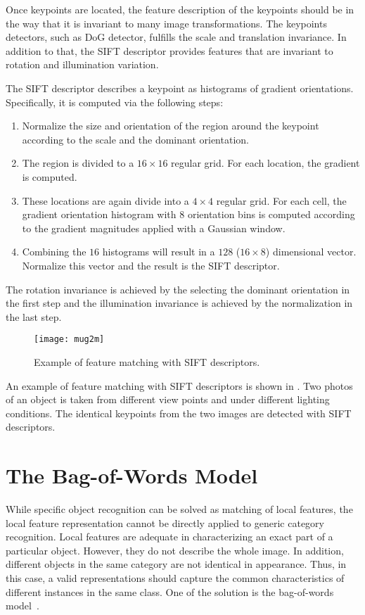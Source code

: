 \documentclass[12pt,final,twoside]{report}
\begin{document}
Once keypoints are located, the feature description of the keypoints should be in the way that it is invariant to many image transformations. The keypoints detectors, such as DoG detector, fulfills the scale and translation invariance. In addition to that, the SIFT descriptor provides features that are invariant to rotation and illumination variation.

The SIFT descriptor describes a keypoint as histograms of gradient orientations. Specifically, it is computed via the following steps:
\begin{enumerate}
  \item Normalize the size and orientation of the region around the keypoint according to the scale and the dominant orientation.
  \item The region is divided to a $16 \times 16$ regular grid. For each location, the gradient is computed.
  \item These locations are again divide into a $4 \times 4$ regular grid. For each cell, the gradient orientation histogram with 8 orientation bins is computed according to the gradient magnitudes applied with a Gaussian window.
  \item Combining the $16$ histograms will result in a $128$ ($16 \times 8$) dimensional vector. Normalize this vector and the result is the SIFT descriptor.
\end{enumerate}

The rotation invariance is achieved by the selecting the dominant orientation in the first step and the illumination invariance is achieved by the normalization in the last step.

\begin{figure}[t]
  \centering
  \texttt{[image: mug2m]}
  \caption{Example of feature matching with SIFT descriptors.}
  \label{fig:match}
\end{figure}

An example of feature matching with SIFT descriptors is shown in . Two photos of an object is taken from different view points and under different lighting conditions. The identical keypoints from the two images are detected with SIFT descriptors.

\section{The Bag-of-Words Model}
While specific object recognition can be solved as matching of local features, the local feature representation cannot be directly applied to generic category recognition. Local features are adequate in characterizing an exact part of a particular object. However, they do not describe the whole image. In addition, different objects in the same category are not identical in appearance. Thus, in this case, a valid representations should capture the common characteristics of different instances in the same class. One of the solution is the bag-of-words model~\cite{csurka_visual_2004}.
\end{document}
